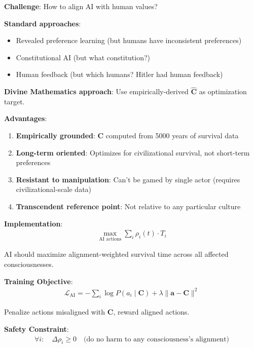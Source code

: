 \documentclass[11pt,a4paper]{article}
\theoremstyle{definition}
\theoremstyle{remark}
\begin{document}
\begin{small}
\begin{enumerate}
\begin{protocol}
\textbf{Challenge}: How to align AI with human values?

\textbf{Standard approaches}:
\begin{itemize}
    \item Revealed preference learning (but humans have inconsistent preferences)
    \item Constitutional AI (but what constitution?)
    \item Human feedback (but which humans? Hitler had human feedback)
\end{itemize}

\textbf{Divine Mathematics approach}: Use empirically-derived \(\hat{\mathbf{C}}\) as optimization target.

\textbf{Advantages}:
\begin{enumerate}
    \item \textbf{Empirically grounded}: \(\mathbf{C}\) computed from 5000 years of survival data
    \item \textbf{Long-term oriented}: Optimizes for civilizational survival, not short-term preferences
    \item \textbf{Resistant to manipulation}: Can't be gamed by single actor (requires civilizational-scale data)
    \item \textbf{Transcendent reference point}: Not relative to any particular culture
\end{enumerate}

\textbf{Implementation}:
\begin{align}
\max_{\text{AI actions}} \sum_i \rho_i(t) \cdot T_i
\end{align}

AI should maximize alignment-weighted survival time across all affected consciousnesses.

\textbf{Training Objective}:
\begin{align}
\mathcal{L}_{\text{AI}} = -\sum_i \log P(a_i \mid \mathbf{C}) + \lambda \|\mathbf{a} - \mathbf{C}\|^2
\end{align}

Penalize actions misaligned with \(\mathbf{C}\), reward aligned actions.

\textbf{Safety Constraint}:
\begin{align}
\forall i: \quad \Delta \rho_i \geq 0 \quad \text{(do no harm to any consciousness's alignment)}
\end{align}
\end{protocol}


\end{enumerate}
\end{small}
\end{document}
